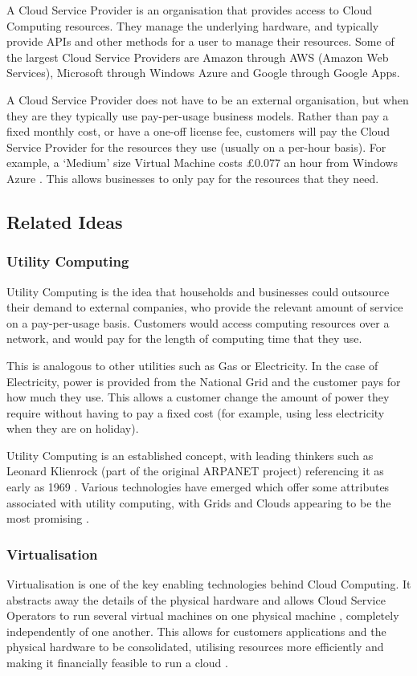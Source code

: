 A Cloud Service Provider is an organisation that provides access to Cloud Computing resources. They manage the underlying hardware, and typically provide APIs and other methods for a user to manage their resources. Some of the largest Cloud Service Providers are Amazon through AWS (Amazon Web Services), Microsoft through Windows Azure and Google through Google Apps.

A Cloud Service Provider does not have to be an external organisation, but when they are they typically use pay-per-usage business models. Rather than pay a fixed monthly cost, or have a one-off license fee, customers will pay the Cloud Service Provider for the resources they use (usually on a per-hour basis). For example, a `Medium' size Virtual Machine costs £0.077 an hour from Windows Azure \cite{AzurePricing}. This allows businesses to only pay for the resources that they need.

\subsection{Related Ideas}
\subsubsection{Utility Computing}
Utility Computing is the idea that households and businesses could outsource their demand to external companies, who provide the relevant amount of service on a pay-per-usage basis. Customers would access computing resources over a network, and would pay for the length of computing time that they use.

This is analogous to other utilities such as Gas or Electricity. In the case of Electricity, power is provided from the National Grid and the customer pays for how much they use. This allows a customer change the amount of power they require without having to pay a fixed cost (for example, using less electricity when they are on holiday).

Utility Computing is an established concept, with leading thinkers such as Leonard Klienrock (part of the original ARPANET project) referencing it as early as 1969 \cite{319}. Various technologies have emerged which offer some attributes associated with utility computing, with Grids and Clouds appearing to be the most promising \cite{buyya2008market}.

\subsubsection{Virtualisation}
Virtualisation is one of the key enabling technologies behind Cloud Computing. It abstracts away the details of the physical hardware and allows Cloud Service Operators to run several virtual machines on one physical machine \cite{zhang2010cloud}, completely independently of one another. This allows for customers applications and the physical hardware to be consolidated, utilising resources more efficiently and making it financially feasible to run a cloud \cite{foster2008cloud}. 

